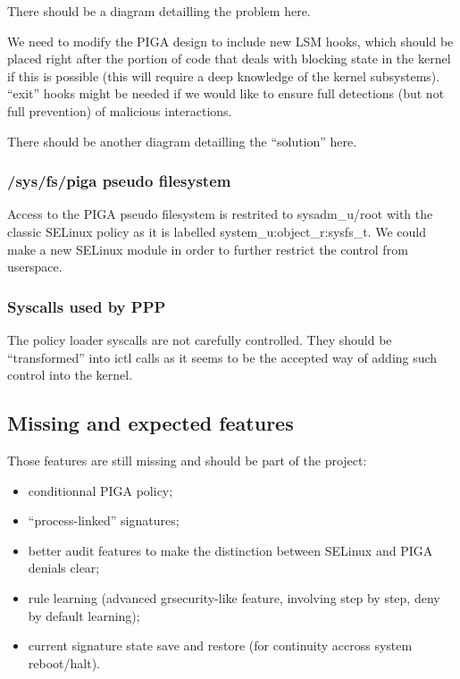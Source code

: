 \documentclass[pdftex,a4paper,titlepage,11pt]{article}
\begin{document}
\bigskip

There should be a diagram detailling the problem here.

\bigskip

We need to modify the PIGA design to include new LSM hooks, which should be
placed right after the portion of code that deals with blocking state in the
kernel if this is possible (this will require a deep knowledge of the kernel
subsystems). ``exit'' hooks might be needed if we would like to ensure full
detections (but not full prevention) of malicious interactions.

\bigskip

There should be another diagram detailling the ``solution'' here.

\subsubsection{/sys/fs/piga pseudo filesystem}

Access to the PIGA pseudo filesystem is restrited to sysadm\_u/root with the
classic SELinux policy as it is labelled system\_u:object\_r:sysfs\_t. We could
make a new SELinux module in order to further restrict the control from
userspace.

\subsubsection{Syscalls used by PPP}

The policy loader syscalls are not carefully controlled. They should be
``transformed'' into ictl calls as it seems to be the accepted way of adding
such control into the kernel.

\subsection{Missing and expected features}

Those features are still missing and should be part of the project:

\begin{itemize}
	\item conditionnal PIGA policy;
	\item ``process-linked'' signatures;
	\item better audit features to make the distinction between SELinux and PIGA
denials clear;
	\item rule learning (advanced grsecurity-like feature, involving step by
step, deny by default learning);
	\item current signature state save and restore (for continuity accross
system reboot/halt).
\end{itemize}
\end{document}
